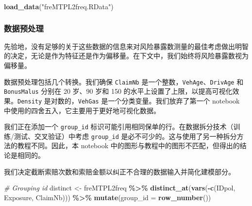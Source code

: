 \documentclass[
]{article}
\newenvironment{Shaded}{\begin{snugshade}}{\end{snugshade}}
\newcommand{\AttributeTok}[1]{\textcolor[rgb]{0.13,0.29,0.53}{#1}}
\newcommand{\CommentTok}[1]{\textcolor[rgb]{0.56,0.35,0.01}{\textit{#1}}}
\newcommand{\FunctionTok}[1]{\textcolor[rgb]{0.13,0.29,0.53}{\textbf{#1}}}
\newcommand{\NormalTok}[1]{#1}
\newcommand{\OtherTok}[1]{\textcolor[rgb]{0.56,0.35,0.01}{#1}}
\newcommand{\SpecialCharTok}[1]{\textcolor[rgb]{0.81,0.36,0.00}{\textbf{#1}}}
\newcommand{\StringTok}[1]{\textcolor[rgb]{0.31,0.60,0.02}{#1}}
\begin{document}
\begin{Shaded}
\begin{Highlighting}[]
\FunctionTok{load\_data}\NormalTok{(}\StringTok{"freMTPL2freq.RData"}\NormalTok{)}
\end{Highlighting}
\end{Shaded}

\subsubsection{数据预处理}\label{ux6570ux636eux9884ux5904ux7406}

先验地，没有足够的关于这些数据的信息来对风险暴露数测量的最佳考虑做出明智的决定，无论是作为特征还是作为偏移量。在下文中，我们始终将风险暴露数视为偏移量。

数据预处理包括几个转换。我们确保 \texttt{ClaimNb}
是一个整数，\texttt{VehAge}、\texttt{DrivAge} 和 \texttt{BonusMalus}
分别在 20 岁、90 岁和 150
的水平上设置了上限，以提高可视化效果。\texttt{Density}
是对数的，\texttt{VehGas} 是一个分类变量。我们放弃了第一个 notebook
中使用的四舍五入，它主要用于更好地可视化数据。

我们正在添加一个 \texttt{group\_id}
标识可能引用相同保单的行。在数据拆分技术（训练/测试、交叉验证）中考虑
\texttt{group\_id}
是必不可少的。这与使用了另一种拆分方法的教程不同。因此，本 notebook
中的图形与教程中的图形不匹配，但得出的结论是相同的。

我们决定截断索赔次数和索赔金额以纠正不合理的数据输入并简化建模部分。

\begin{Shaded}
\begin{Highlighting}[]
\CommentTok{\# Grouping id}
\NormalTok{distinct }\OtherTok{\textless{}{-}}\NormalTok{ freMTPL2freq }\SpecialCharTok{\%\textgreater{}\%} 
  \FunctionTok{distinct\_at}\NormalTok{(}\FunctionTok{vars}\NormalTok{(}\SpecialCharTok{{-}}\FunctionTok{c}\NormalTok{(IDpol, Exposure, ClaimNb))) }\SpecialCharTok{\%\textgreater{}\%} 
  \FunctionTok{mutate}\NormalTok{(}\AttributeTok{group\_id =} \FunctionTok{row\_number}\NormalTok{())}
\end{Highlighting}
\end{Shaded}
\end{document}
